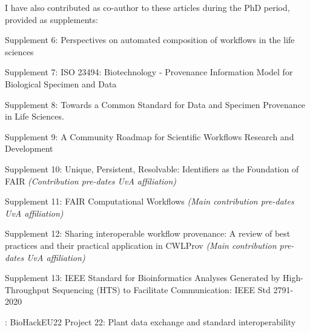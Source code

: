 I have also contributed as co-author to these articles during the PhD
period, provided as supplements:

 \cite{ch6-37}

 \cite{De Geest 2022}

 \cite{Goble 2021}

 \cite{Crusoe 2022}

 \cite{Kuhn 2021}

Supplement 6:
Perspectives on automated composition of workflows in the life sciences \cite{lamprechtPerspectivesAutomatedComposition2021b}

Supplement 7: ISO 23494: Biotechnology - Provenance Information Model for Biological
Specimen and Data \cite{Wittner 2020}

Supplement 8: Towards a
Common Standard for Data and Specimen Provenance in Life Sciences. \cite{Wittner 2023}

Supplement 9: A Community Roadmap for Scientific Workflows Research and Development \cite{ch6-39}

Supplement 10: Unique, Persistent, Resolvable: Identifiers as the Foundation of FAIR \cite{Juty 2020} 
\emph{(Contribution pre-dates UvA affiliation)} 

Supplement 11: FAIR Computational Workflows \cite{Goble 2020} \emph{(Main contribution pre-dates UvA
affiliation)} 

Supplement 12: Sharing
interoperable workflow provenance: A review of best practices and their
practical application in CWLProv \cite{ch5-68} \emph{(Main contribution pre-dates UvA
affiliation)} 

Supplement
13: IEEE Standard for Bioinformatics Analyses Generated by
High-Throughput Sequencing (HTS) to Facilitate Communication: IEEE Std
2791-2020 \cite{ch5-64}

: BioHackEU22 Project 22: Plant data exchange and standard interoperability

